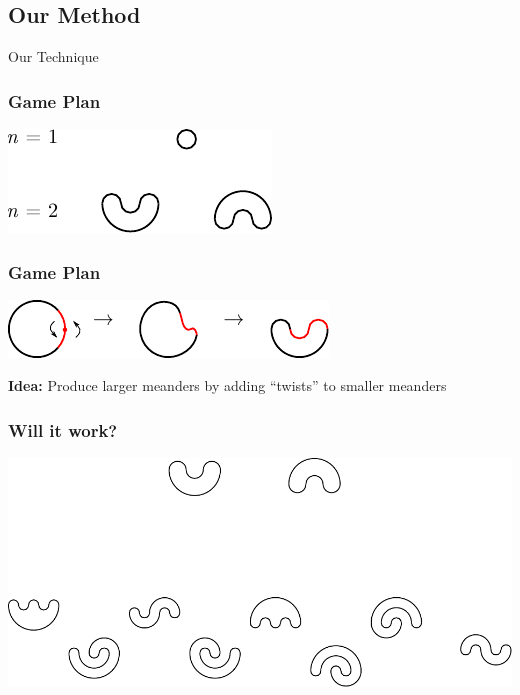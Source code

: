 \documentclass{beamer}
\begin{document}
\subsection{Our Method}

\begin{frame}
\begin{center}
\Huge{Our Technique}
\end{center}
\end{frame}

\begin{frame}
\frametitle{Game Plan}
\begin{center}
\includegraphics[width=.8\textwidth]{meanders/1-with-2.pdf}
\end{center}
\end{frame}

\begin{frame}
\frametitle{Game Plan}
\begin{center}
\includegraphics[width=.8\textwidth]{meanders/1-into-2.pdf}
\end{center}
\pause
\textbf{Idea:} Produce larger meanders by adding ``twists'' to smaller meanders
\end{frame}

\begin{frame}
\frametitle{Will it work?}
\begin{center}
\includegraphics[width=\textwidth]{meanders/2-into-3_1.pdf}
\end{center}
\end{frame}
\end{document}
